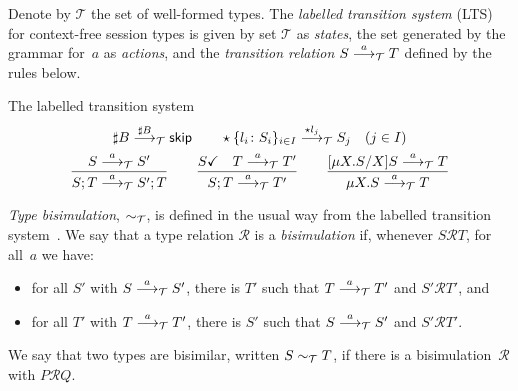 Denote by $\mathcal{T}$ the set of well-formed types.
%
The \emph{labelled transition system} (LTS) for context-free session
types is given by set $\mathcal{T}$ as \emph{states}, the set
generated by the grammar for~$a$ as \emph{actions}, and the
\emph{transition relation} $S\LTSderives T$ defined by the rules below.

\noindent The labelled transition system\hfill{}
%
\begin{gather*}
  \sharp B \LTSderives[\sharp B] \skipk
  \qquad
  \star\{l_i\colon S_i\}_{i\in I} \LTSderives[\star l_j] S_j\quad
  (j\in I)
  \\
  \frac{S \LTSderives S'}{S; T \LTSderives S';T}
  \qquad
  \frac{\DONE{S} \quad T \LTSderives T'}{S; T \LTSderives T'}
  \qquad
  \frac{\subs{\mu X.S}{X}S \LTSderives T}{\mu X.S \LTSderives T}
\end{gather*}

\emph{Type bisimulation}, $\TypeEquiv$, is defined in the usual way from the
labelled transition system~\cite{sangiorgi2014introduction}.
%
We say that a type relation $\mathcal R$ is a \emph{bisimulation} if,
whenever $S\mathcal RT$, for all~$a$ we have:
%
\begin{itemize}
\item for all $S'$ with $S \LTSderives S'$, there is $T'$ such that $T
  \LTSderives T'$ and $S'\mathcal RT'$, and
\item for all $T'$ with $T \LTSderives T'$, there is $S'$ such that $S
  \LTSderives S'$ and $S'\mathcal RT'$.
\end{itemize}
%
We say that two types are bisimilar, written $S \bisim T$, if there
is a bisimulation~$\mathcal R$ with $P\mathcal RQ$.

